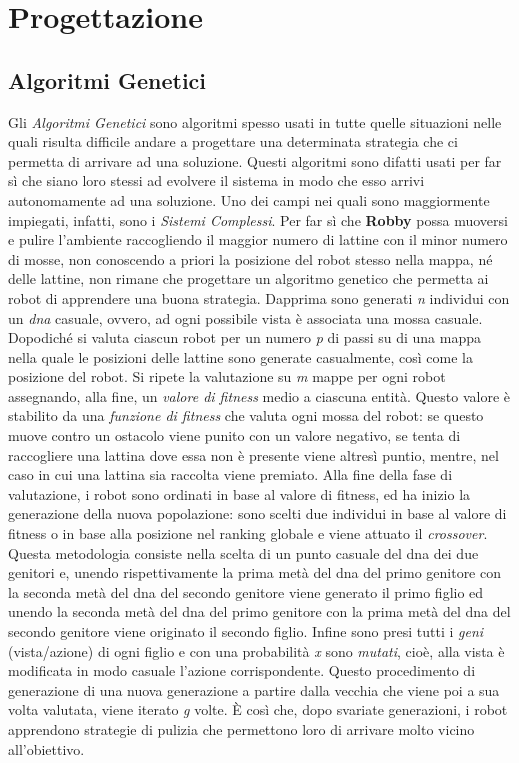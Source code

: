 \chapter{Progettazione}

\section{Algoritmi Genetici}
Gli \textit{Algoritmi Genetici} sono algoritmi spesso usati in tutte quelle
situazioni nelle quali risulta difficile andare a progettare una determinata
strategia che ci permetta di arrivare ad una soluzione.\newline
Questi algoritmi sono difatti usati per far sì che siano loro stessi ad evolvere
il sistema in modo che esso arrivi autonomamente ad una soluzione. Uno dei campi
nei quali sono maggiormente impiegati, infatti, sono i \textit{Sistemi
Complessi}.\newline
Per far sì che \textbf{Robby} possa muoversi e pulire l'ambiente raccogliendo il
maggior numero di lattine con il minor numero di mosse, non conoscendo a priori
la posizione del robot stesso nella mappa, né delle lattine, non rimane che
progettare un algoritmo genetico che permetta ai robot di apprendere una buona
strategia.\newline
Dapprima sono generati \textit{n} individui con un \textit{dna} casuale, ovvero,
ad ogni possibile vista è associata una mossa casuale. Dopodiché si valuta
ciascun robot per un numero \textit{p} di passi su di una mappa nella quale le
posizioni delle lattine sono generate casualmente, così come la posizione del
robot. Si ripete la valutazione su \textit{m} mappe per ogni robot assegnando,
alla fine, un \textit{valore di fitness} medio a ciascuna entità. Questo valore
è stabilito da una \textit{funzione di fitness} che valuta ogni mossa del robot:
se questo muove contro un ostacolo viene punito con un valore negativo, se tenta
di raccogliere una lattina dove essa non è presente viene altresì puntio,
mentre, nel caso in cui una lattina sia raccolta viene premiato. Alla fine della
fase di valutazione, i robot sono ordinati in base al valore di fitness, ed ha
inizio la generazione della nuova popolazione: sono scelti due individui in base
al valore di fitness o in base alla posizione nel ranking globale e viene
attuato il \textit{crossover}. Questa metodologia consiste nella scelta di un
punto casuale del dna dei due genitori e, unendo rispettivamente la prima metà
del dna del primo genitore con la seconda metà del dna del secondo genitore
viene generato il primo figlio ed unendo la seconda metà del dna del primo
genitore con la prima metà del dna del secondo genitore viene originato il
secondo figlio. Infine sono presi tutti i \textit{geni} (vista/azione) di ogni
figlio e con una probabilità \textit{x} sono \textit{mutati}, cioè, alla vista
è modificata in modo casuale l'azione corrispondente. Questo procedimento di
generazione di una nuova generazione a partire dalla vecchia che viene poi a sua
volta valutata, viene iterato \textit{g} volte. È così che, dopo svariate
generazioni, i robot apprendono strategie di pulizia che permettono loro di
arrivare molto vicino all'obiettivo.
